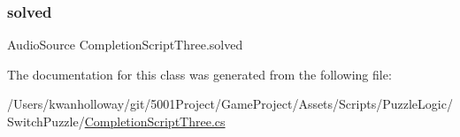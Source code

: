 \mbox{\label{class_completion_script_three_ac7eba76f069c14642b9fbbf1dbffd81d}} 
\subsubsection{\texorpdfstring{solved}{solved}}
{\footnotesize\ttfamily Audio\+Source Completion\+Script\+Three.\+solved}



The documentation for this class was generated from the following file\+:\begin{DoxyCompactItemize}
\item 
/\+Users/kwanholloway/git/5001\+Project/\+Game\+Project/\+Assets/\+Scripts/\+Puzzle\+Logic/\+Switch\+Puzzle/\hyperlink{_completion_script_three_8cs}{Completion\+Script\+Three.\+cs}\end{DoxyCompactItemize}
